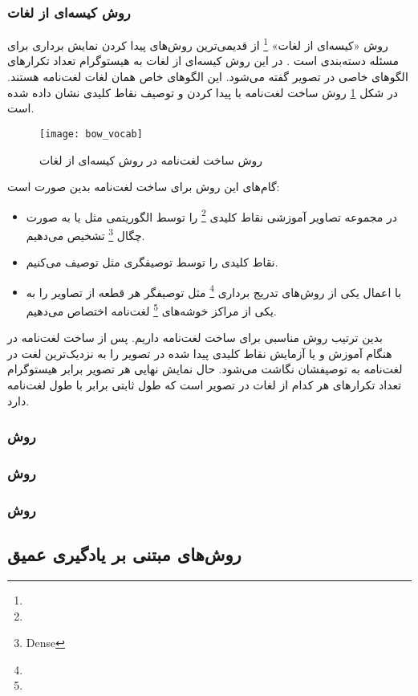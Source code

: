 \documentclass[11pt]{article}
\begin{document}
\subsubsection{روش کیسه‌ای از لغات}
روش «کیسه‌ای از لغات»
\footnote{}
از قدیمی‌ترین روش‌های پیدا کردن نمایش برداری برای مسئله دسته‌بندی است
\cite{csurka2004}.
در این روش کیسه‌ای از لغات به هیستوگرام تعداد تکرارهای الگوهای خاصی در تصویر گفته می‌شود. این الگوهای خاص همان لغات لغت‌نامه هستند. در شکل
\ref{fig:img_class:bow_vocab}
روش ساخت لغت‌نامه با پیدا کردن و توصیف نقاط کلیدی نشان داده شده است.
\begin{figure}[t!]
	\centering
	\texttt{[image: bow\_vocab]}
	\caption{روش ساخت لغت‌نامه در روش کیسه‌ای از لغات}
	\label{fig:img_class:bow_vocab}
\end{figure}
گام‌های این روش برای ساخت لغت‌نامه بدین صورت است:
\begin{itemize}
	\item در مجموعه تصاویر آموزشی نقاط کلیدی
	\footnote{}
	را توسط الگوریتمی مثل
	 \cite{harris_affine}
	یا به صورت چگال
	\footnote{Dense}
	تشخیص می‌دهیم.

	\item نقاط کلیدی را توسط توصیفگری مثل
	 \cite{sift}
	توصیف می‌کنیم.
	\item با اعمال یکی از روش‌های تدریج برداری
	\footnote{}
	مثل
	توصیفگر هر قطعه از تصاویر را به یکی از مراکز خوشه‌های
	\footnote{}
	لغت‌نامه اختصاص می‌دهیم.
\end{itemize}
بدین ترتیب روش مناسبی برای ساخت لغت‌نامه داریم. پس از ساخت لغت‌نامه در هنگام آموزش و یا آزمایش نقاط کلیدی پیدا شده در تصویر را به نزدیک‌ترین لغت در لغت‌نامه به توصیفشان نگاشت می‌شود. حال نمایش نهایی هر تصویر برابر هیستوگرام تعداد تکرارهای هر کدام از لغات در تصویر است که طول ثابتی برابر با طول لغت‌نامه دارد.
\subsubsection{روش }
\subsubsection{روش }
\subsubsection{روش }

\subsection{روش‌های مبتنی بر یادگیری عمیق}
\end{document}
